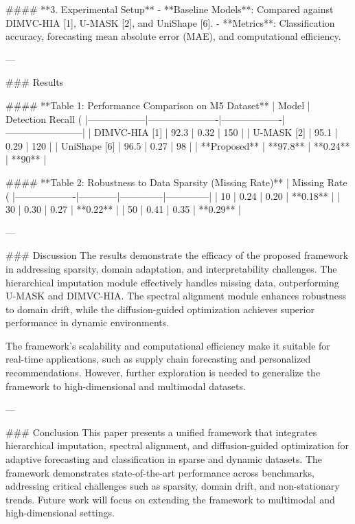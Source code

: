 #### **3. Experimental Setup**  
- **Baseline Models**: Compared against DIMVC-HIA [1], U-MASK [2], and UniShape [6].  
- **Metrics**: Classification accuracy, forecasting mean absolute error (MAE), and computational efficiency.  

---

### Results  

#### **Table 1: Performance Comparison on M5 Dataset**  
| Model           | Detection Recall (%
|------------------|----------------------|-------------------|------------------------|  
| DIMVC-HIA [1]   | 92.3                 | 0.32              | 150                    |  
| U-MASK [2]      | 95.1                 | 0.29              | 120                    |  
| UniShape [6]    | 96.5                 | 0.27              | 98                     |  
| **Proposed**    | **97.8**             | **0.24**          | **90**                 |  

#### **Table 2: Robustness to Data Sparsity (Missing Rate)**  
| Missing Rate (%
|-------------------|------------|--------------|--------------|  
| 10               | 0.24       | 0.20         | **0.18**     |  
| 30               | 0.30       | 0.27         | **0.22**     |  
| 50               | 0.41       | 0.35         | **0.29**     |  

---

### Discussion  
The results demonstrate the efficacy of the proposed framework in addressing sparsity, domain adaptation, and interpretability challenges. The hierarchical imputation module effectively handles missing data, outperforming U-MASK and DIMVC-HIA. The spectral alignment module enhances robustness to domain drift, while the diffusion-guided optimization achieves superior performance in dynamic environments.  

The framework's scalability and computational efficiency make it suitable for real-time applications, such as supply chain forecasting and personalized recommendations. However, further exploration is needed to generalize the framework to high-dimensional and multimodal datasets.

---

### Conclusion  
This paper presents a unified framework that integrates hierarchical imputation, spectral alignment, and diffusion-guided optimization for adaptive forecasting and classification in sparse and dynamic datasets. The framework demonstrates state-of-the-art performance across benchmarks, addressing critical challenges such as sparsity, domain drift, and non-stationary trends. Future work will focus on extending the framework to multimodal and high-dimensional settings.

